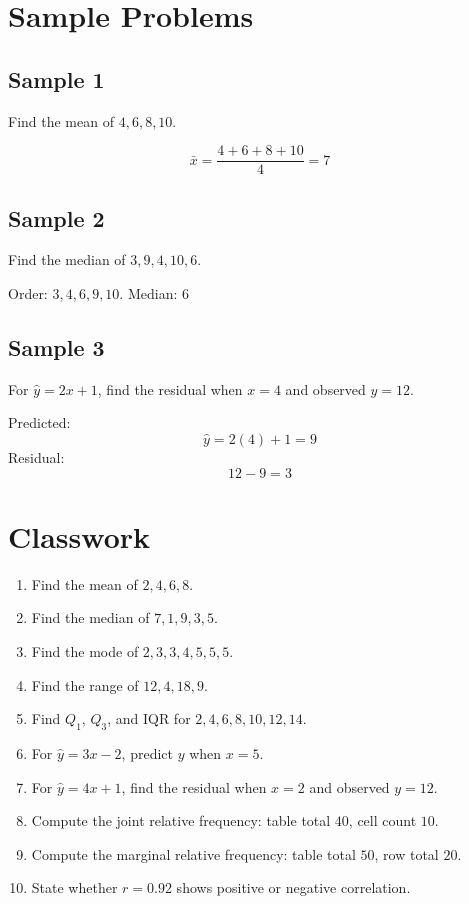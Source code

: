 \documentclass[11pt]{book}
\begin{document}
\section{Sample Problems}

\subsection{Sample 1}

Find the mean of \(4,6,8,10\).

\[\bar{x}=\frac{4+6+8+10}{4}=7\]

\subsection{Sample 2}

Find the median of \(3,9,4,10,6\).

Order: \(3,4,6,9,10\). Median: \(6\)

\subsection{Sample 3}

For \(\hat y=2x+1\), find the residual when \(x=4\) and observed \(y=12\).

Predicted:
\[\hat y=2(4)+1=9\]
Residual:
\[12-9=3\]

\section{Classwork}

\begin{enumerate}
\item Find the mean of \(2,4,6,8\).
\item Find the median of \(7,1,9,3,5\).
\item Find the mode of \(2,3,3,4,5,5,5\).
\item Find the range of \(12,4,18,9\).
\item Find \(Q_1\), \(Q_3\), and IQR for \(2,4,6,8,10,12,14\).
\item For \(\hat y=3x-2\), predict \(y\) when \(x=5\).
\item For \(\hat y=4x+1\), find the residual when \(x=2\) and observed \(y=12\).
\item Compute the joint relative frequency: table total \(40\), cell count \(10\).
\item Compute the marginal relative frequency: table total \(50\), row total \(20\).
\item State whether \(r=0.92\) shows positive or negative correlation.
\end{enumerate}
\end{document}
